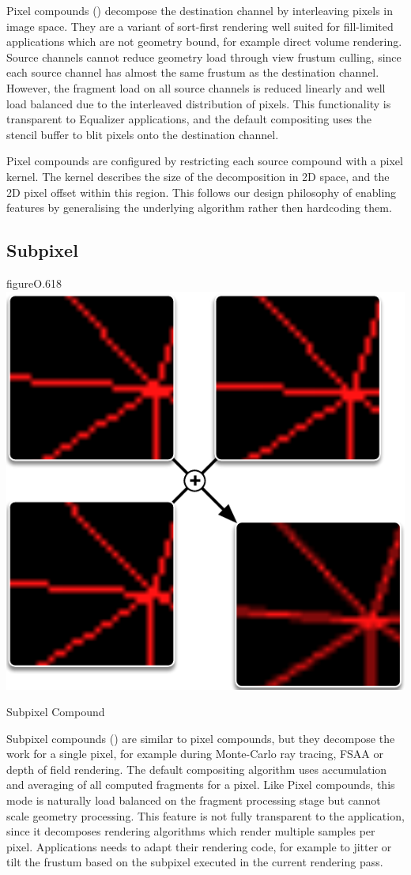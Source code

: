 Pixel compounds () decompose the destination channel by
interleaving pixels in image space. They are a variant of sort-first rendering
well suited for fill-limited applications which are not geometry bound, for
example direct volume rendering. Source channels cannot reduce geometry load
through view frustum culling, since each source channel has almost the same
frustum as the destination channel. However, the fragment load on all source
channels is reduced linearly and well load balanced due to the interleaved
distribution of pixels. This functionality is transparent to \textsf{Equalizer}
applications, and the default compositing uses the stencil buffer to blit
pixels onto the destination channel.

Pixel compounds are configured by restricting each source compound with a pixel
kernel. The kernel describes the size of the decomposition in 2D space, and the
2D pixel offset within this region. This follows our design philosophy of
enabling features by generalising the underlying algorithm rather then
hardcoding them.

\subsection{Subpixel}

\begin{wrapfloat}{figure}{O}{.618\textwidth}
 \includegraphics[width=.618\textwidth]{images/Subpixel}
 {\caption{\label{fSubpixel}Subpixel Compound}}
\end{wrapfloat}

Subpixel compounds () are similar to pixel compounds, but they
decompose the work for a single pixel, for example during Monte-Carlo ray
tracing, FSAA or depth of field rendering. The default compositing algorithm
uses accumulation and averaging of all computed fragments for a pixel. Like
Pixel compounds, this mode is naturally load balanced on the fragment
processing stage but cannot scale geometry processing. This feature is not
fully transparent to the application, since it decomposes rendering algorithms
which render multiple samples per pixel. Applications needs to adapt their
rendering code, for example to jitter or tilt the frustum based on the subpixel
executed in the current rendering pass.


